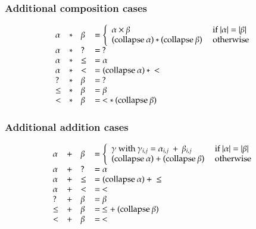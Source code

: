 \subsubsection{Additional composition cases}
\[
\begin{array}{llll}
\alpha  & * &\beta & = \left\{ \begin{array}{ll}
                          \alpha \times \beta & \mbox{ if } \vert \alpha \vert = \vert \beta \vert \\
                          (\mathrm{collapse}\: \alpha) * (\mathrm{collapse}\: \beta) & \mbox{ otherwise}  
                          \end{array}\right.\\ 
\alpha  & * & ?     & = \: ? \\
\alpha  & * & \leq  & = \alpha \\
\alpha  & * & <     & = (\mathrm{collapse}\: \alpha) \: * \: < \\
?       & * & \beta & = \: ? \\
\leq    & * & \beta & = \beta \\
<       & * & \beta & = \: < * \: (\mathrm{collapse}\: \beta)
\end{array}
\]
\subsubsection{Additional addition cases}

\[
\begin{array}{llll}
\alpha  & + &\beta & = \left\{ \begin{array}{ll}
                          \gamma \mbox{ with } \gamma_{i,j} = \alpha_{i,j} \: + \: \beta_{i,j} & \mbox{ if } \vert \alpha \vert = \vert \beta \vert \\
                          (\mathrm{collapse}\: \alpha) + (\mathrm{collapse}\: \beta) & \mbox{ otherwise}  
                          \end{array}\right.\\ 
\alpha  & + & ?     & = \alpha \\
\alpha  & + & \leq  & = (\mathrm{collapse}\: \alpha) \: + \: \leq \\
\alpha  & + & <     & = \: < \\
?       & + & \beta & = \beta \\
\leq    & + & \beta & = \: \leq + \: (\mathrm{collapse}\: \beta)\\
<       & + & \beta & = \: < \\
\end{array}
\]

